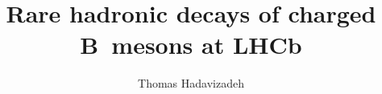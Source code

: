 \title{Rare hadronic decays of charged B~mesons at LHCb}
\author{Thomas Hadavizadeh}




\maketitle

